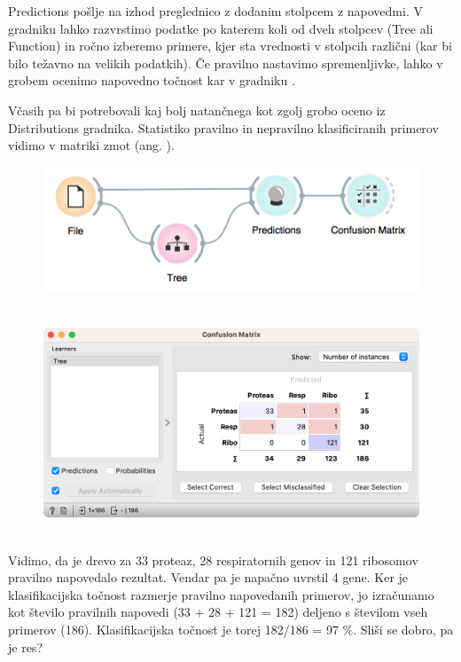 Predictions pošlje na izhod preglednico z dodanim stolpcem z napovedmi. V gradniku  lahko razvrstimo podatke po katerem koli od dveh stolpcev (Tree ali Function) in ročno izberemo primere, kjer sta vrednosti v stolpcih različni (kar bi bilo težavno na velikih podatkih). Če pravilno nastavimo spremenljivke, lahko v grobem ocenimo napovedno točnost kar v gradniku .

\newpage
\clearpage

Včasih pa bi potrebovali kaj bolj natančnega kot zgolj grobo oceno iz Distributions gradnika. Statistiko pravilno in nepravilno klasificiranih primerov vidimo v matriki zmot (ang. ).

\begin{figure}[h]
    \includegraphics[width=0.9\linewidth]{workflow2.png}
    \caption{$\;$}
\end{figure}

\begin{figure}[h]
    \includegraphics[width=0.7\linewidth]{confusion-matrix.png}
    \caption{$\;$}
\end{figure}

Vidimo, da je drevo za 33 proteaz, 28 respiratornih genov in 121 ribosomov pravilno napovedalo rezultat. Vendar pa je napačno uvrstil 4 gene. Ker je klasifikacijska točnost razmerje pravilno napovedanih primerov, jo izračunamo kot število pravilnih napovedi (33 + 28 + 121 = 182) deljeno s številom vseh primerov (186). Klasifikacijska točnost je torej 182/186 =  97 \%. Sliši se dobro, pa je res?